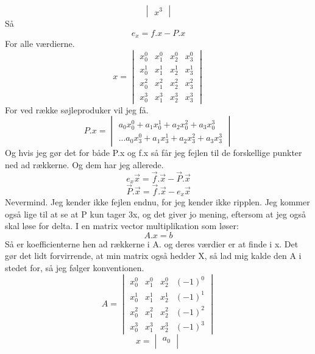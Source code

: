 \begin{Opgaver}
\begin{kapitel}
\begin{Opgave}
\begin{UnderOpgave}[Choose an initial set of m + 2 = 4 nodes \text{$\left[\zeta_{k}\right]_{k=0}^{3}$} as 0, 1/3, 2/3, and 1, ...]
\[\begin{vmatrix}
                    x^3 
                \end{vmatrix}\]
                Så 
                \[e_x = f.x - P.x\]
                For alle værdierne. 
                \[x = 
                \begin{vmatrix}
                    x_0^0 & x_1^0 & x_2^0 & x_3^0 \\
                    x_0^1 & x_1^1 & x_2^1 & x_3^1 \\
                    x_0^2 & x_1^2 & x_2^2 & x_3^2 \\
                    x_0^3 & x_1^3 & x_2^3 & x_3^3
                \end{vmatrix}\]
                For ved række søjleproduker vil jeg få. 
                \[P.x = 
                \begin{vmatrix}
                    a_0x_0^0 + a_1x_0^1 + a_2x_0^2 + a_3x_0^3 \\
                    ...
                    a_0x_3^0 + a_1x_3^1 + a_2x_3^2 + a_3x_3^3
                \end{vmatrix}\]
                Og hvis jeg gør det for både P.x og f.x så får jeg fejlen til de forskellige punkter ned ad rækkerne. Og dem har jeg allerede. 
                \[{e_x}\vec{x} = \vec{f}.\vec{x} - \vec{P}.\vec{x}\]
                \[\vec{P}.\vec{x} = \vec{f}.\vec{x} - {e_x}\vec{x}\]
                Nevermind. Jeg kender ikke fejlen endnu, for jeg kender ikke ripplen. 
                Jeg kommer også lige til at se at P kun tager 3x, og det giver jo mening, eftersom at jeg også skal løse for delta.
                I en matrix vector multiplikation som løser: 
                \[A.x = b\]
                Så er koefficienterne hen ad rækkerne i A. 
                og deres værdier er at finde i x. 
                Det gør det lidt forvirrende, at min matrix også hedder X, så lad mig kalde den A i stedet for, så jeg følger konventionen. 
                \[A = 
                \begin{vmatrix}
                    x_0^0 & x_1^0 & x_2^0 & (-1)^0 \\
                    x_0^1 & x_1^1 & x_2^1 & (-1)^1 \\
                    x_0^2 & x_1^2 & x_2^2 & (-1)^2 \\
                    x_0^3 & x_1^3 & x_2^3 & (-1)^3
                \end{vmatrix}\]
                \[x = 
                \begin{vmatrix}
                    a_0 \\

\end{vmatrix}\]
\end{UnderOpgave}
\end{Opgave}
\end{kapitel}
\end{Opgaver}
